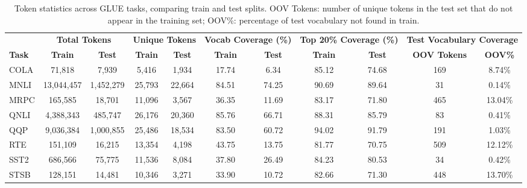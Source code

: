 \begin{table*}[htbp]
\centering
\scriptsize
\setlength{\tabcolsep}{3.5pt}
\begin{tabular}{l|cc|cc|cc|cc|cc}
\toprule
& \multicolumn{2}{c|}{\textbf{Total Tokens}} & \multicolumn{2}{c|}{\textbf{Unique Tokens}} & \multicolumn{2}{c|}{\textbf{Vocab Coverage (\%)}} & \multicolumn{2}{c|}{\textbf{Top 20\% Coverage (\%)}} & \multicolumn{2}{c}{\textbf{Test Vocabulary Coverage}} \\
\textbf{Task} & \textbf{Train} & \textbf{Test} & \textbf{Train} & \textbf{Test} & \textbf{Train} & \textbf{Test} & \textbf{Train} & \textbf{Test} & \textbf{OOV Tokens} & \textbf{OOV\%} \\
\midrule
COLA & 71,818 & 7,939 & 5,416 & 1,934 & 17.74 & 6.34 & 85.12 & 74.68 & 169 & 8.74\% \\
MNLI & 13,044,457 & 1,452,279 & 25,793 & 22,664 & 84.51 & 74.25 & 90.69 & 89.64 & 31 & 0.14\% \\
MRPC & 165,585 & 18,701 & 11,096 & 3,567 & 36.35 & 11.69 & 83.17 & 71.80 & 465 & 13.04\% \\
QNLI & 4,388,343 & 485,747 & 26,176 & 20,360 & 85.76 & 66.71 & 88.31 & 85.79 & 83 & 0.41\% \\
QQP & 9,036,384 & 1,000,855 & 25,486 & 18,534 & 83.50 & 60.72 & 94.02 & 91.79 & 191 & 1.03\% \\
RTE & 151,109 & 16,215 & 13,354 & 4,198 & 43.75 & 13.75 & 81.77 & 70.75 & 509 & 12.12\% \\
SST2 & 686,566 & 75,775 & 11,536 & 8,084 & 37.80 & 26.49 & 84.23 & 80.53 & 34 & 0.42\% \\
STSB & 128,151 & 14,481 & 10,346 & 3,271 & 33.90 & 10.72 & 82.66 & 71.30 & 448 & 13.70\% \\
\bottomrule
\end{tabular}
\caption{Token statistics across GLUE tasks, comparing train and test splits. OOV Tokens: number of unique tokens in the test set that do not appear in the training set; OOV\%: percentage of test vocabulary not found in train.}
\label{tab:token_statistics}
\end{table*}